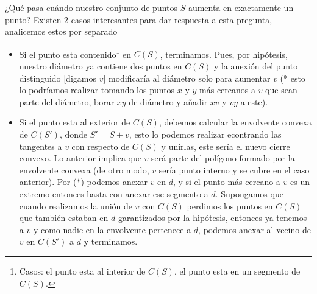 ¿Qué pasa cuándo nuestro conjunto de puntos $S$ aumenta en exactamente un punto? Existen 2 casos
interesantes para dar respuesta a esta pregunta, analicemos estos por separado
\begin{itemize}
\item Si el punto esta contenido\footnote{Casos: el punto esta al interior de $C(S)$, el punto esta en un segmento de $C(S)$.} en $C(S)$,
  terminamos. Pues, por hipótesis, nuestro diámetro ya contiene dos puntos en $C(S)$ y la anexión del punto distinguido [digamos $v$] modificaría
  al diámetro solo para aumentar $v$ (* esto lo podríamos  realizar tomando los puntos $x$ y $y$ más cercanos a $v$ que sean parte del diámetro, borar
  $xy$ de diámetro y añadir $xv$ y $vy$ a este).
  
\item Si el punto esta al exterior de $C(S)$, debemos calcular la envolvente convexa de $C(S')$, donde $S' = S + v$, esto lo podemos realizar
  econtrando las tangentes a $v$ con respecto de $C(S)$ y unirlas, este sería el nuevo cierre convexo. Lo anterior implica que $v$ será parte
  del polígono formado por la envolvente convexa (de otro modo, $v$ sería punto interno y se cubre en el caso anterior). Por ($*$) podemos anexar
  $v$ en $d$, y si el punto más cercano a $v$ es un extremo entonces basta con anexar ese segmento a $d$. Supongamos que cuando realizamos la
  unión de $v$ con $C(S)$ perdimos los puntos en $C(S)$ que también estaban en $d$ garantizados por la hipótesis, entonces ya tenemos a $v$ y como
  nadie en la envolvente pertenece a $d$, podemos anexar al vecino de $v$ en $C(S')$ a $d$ y terminamos.
\end{itemize}

